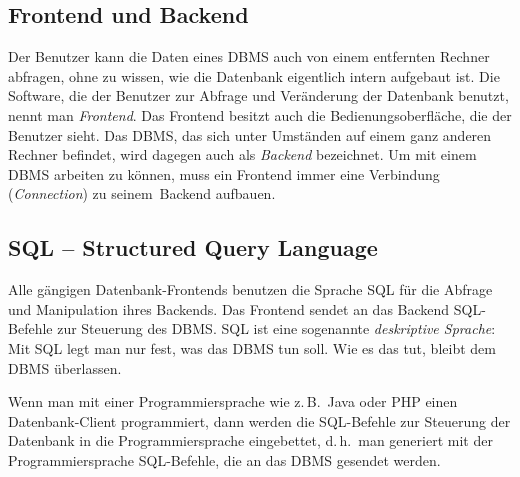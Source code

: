 \subsection{Frontend und Backend}

Der Benutzer kann die Daten eines DBMS auch von einem entfernten Rechner
abfragen, ohne zu wissen, wie die Datenbank eigentlich intern aufgebaut ist. Die
Software, die der Benutzer zur Abfrage und Veränderung der Datenbank benutzt,
nennt man \emph{Frontend}. Das Frontend besitzt auch die
Bedienungsoberfläche, die der Benutzer sieht. Das DBMS, das sich unter Umständen
auf einem ganz anderen Rechner befindet, wird dagegen auch als \emph{Backend}
bezeichnet. Um mit einem DBMS arbeiten zu können, muss ein Frontend immer eine
Verbindung (\emph{Connection}) zu \glqq seinem\grqq\ Backend aufbauen.

\subsection{SQL -- Structured Query Language}

Alle gängigen Datenbank-Frontends benutzen die Sprache SQL für die Abfrage und
Manipulation ihres Backends. Das Frontend sendet an das Backend SQL-Befehle
zur Steuerung des DBMS. SQL ist eine sogenannte \emph{deskriptive Sprache}:
Mit SQL legt man nur fest, was das DBMS tun soll. Wie es das tut, bleibt dem
DBMS überlassen.

Wenn man mit einer Programmiersprache wie z.\,B.\ Java oder PHP einen
Datenbank-Client programmiert, dann werden die SQL-Befehle zur Steuerung der
Datenbank in die Programmiersprache \glqq eingebettet\grqq , d.\,h.\
man generiert mit der Programmiersprache SQL-Befehle, die an das DBMS gesendet
werden.
